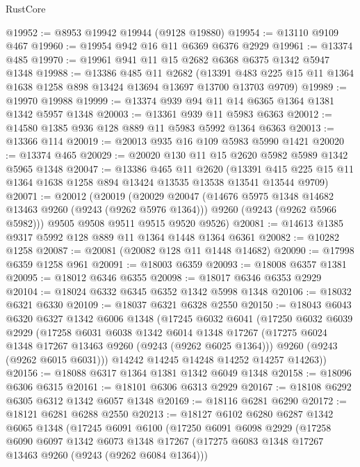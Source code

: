 \begin{lexlean}{RustCore}
\begin{coremodule}
@19952 := @8953 @19942 @19944 (@9128 @19880)
@19954 := @13110 @9109 @467
@19960 := @19954 @942 @16 @11 @6369 @6376 @2929
@19961 := @13374 @485
@19970 := @19961 @941 @11 @15 @2682 @6368 @6375 @1342 @5947 @1348
@19988 := @13386
    @485
    @11
    @2682
    (@13391 @483 @225 @15 @11 @1364 @1638 @1258 @898 @13424 @13694 @13697 @13700 @13703 @9709)
@19989 := @19970 @19988
@19999 := @13374 @939 @94 @11 @14 @6365 @1364 @1381 @1342 @5957 @1348
@20003 := @13361 @939 @11 @5983 @6363
@20012 := @14580 @1385 @936 @128 @889 @11 @5983 @5992 @1364 @6363
@20013 := @13366 @114
@20019 := @20013 @935 @16 @109 @5983 @5990 @1421
@20020 := @13374 @465
@20029 := @20020 @130 @11 @15 @2620 @5982 @5989 @1342 @5965 @1348
@20047 := @13386
    @465
    @11
    @2620
    (@13391 @415 @225 @15 @11 @1364 @1638 @1258 @894 @13424 @13535 @13538 @13541 @13544 @9709)
@20071 := @20012
    (@20019
      (@20029
        @20047
        (@14676 @5975 @1348 @14682 @13463 @9260 (@9243 (@9262 @5976 @1364)))
        @9260
        (@9243 (@9262 @5966 @5982)))
      @9505
      @9508
      @9511
      @9515
      @9520
      @9526)
@20081 := @14613 @1385 @9317 @5992 @128 @889 @11 @1364 @1448 @1364 @6361
@20082 := @10282 @1258
@20087 := @20081 (@20082 @128 @11 @1448 @14682)
@20090 := @17998 @6359 @1258 @961
@20091 := @18003 @6359
@20093 := @18008 @6357 @1381
@20095 := @18012 @6346 @6355
@20098 := @18017 @6346 @6353 @2929
@20104 := @18024 @6332 @6345 @6352 @1342 @5998 @1348
@20106 := @18032 @6321 @6330
@20109 := @18037 @6321 @6328 @2550
@20150 := @18043
    @6043
    @6320
    @6327
    @1342
    @6006
    @1348
    (@17245
      @6032
      @6041
      (@17250
        @6032
        @6039
        @2929
        (@17258
          @6031
          @6038
          @1342
          @6014
          @1348
          @17267
          (@17275 @6024 @1348 @17267 @13463 @9260 (@9243 (@9262 @6025 @1364)))
          @9260
          (@9243 (@9262 @6015 @6031)))
        @14242
        @14245
        @14248
        @14252
        @14257
        @14263))
@20156 := @18088 @6317 @1364 @1381 @1342 @6049 @1348
@20158 := @18096 @6306 @6315
@20161 := @18101 @6306 @6313 @2929
@20167 := @18108 @6292 @6305 @6312 @1342 @6057 @1348
@20169 := @18116 @6281 @6290
@20172 := @18121 @6281 @6288 @2550
@20213 := @18127
    @6102
    @6280
    @6287
    @1342
    @6065
    @1348
    (@17245
      @6091
      @6100
      (@17250
        @6091
        @6098
        @2929
        (@17258
          @6090
          @6097
          @1342
          @6073
          @1348
          @17267
          (@17275 @6083 @1348 @17267 @13463 @9260 (@9243 (@9262 @6084 @1364)))

\end{coremodule}
\end{lexlean}
